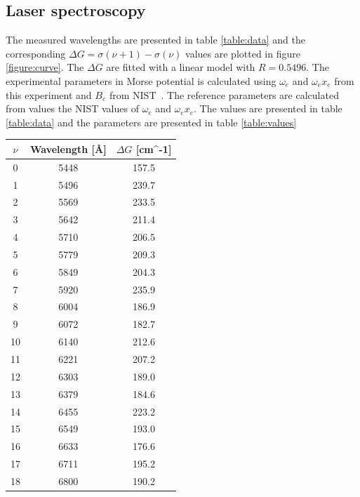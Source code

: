\documentclass[12pt]{article}
\begin{document}
\subsection{Laser spectroscopy}
The measured wavelengths are presented in table \ref{table:data} and the corresponding $\Delta G = \sigma(\nu + 1) - \sigma(\nu)$ values are plotted in figure \ref{figure:curve}. The $\Delta G$ are fitted with a linear model with $R = 0.5496$. The experimental parameters in Morse potential is calculated using $\omega_e$ and $\omega_ex_e$ from this experiment and $B_e$ from NIST~\cite{NIST}. The reference parameters are calculated from values the NIST values of $\omega_e$ and $\omega_ex_e$. The values are presented in table \ref{table:data} and the parameters are presented in table \ref{table:values}

\begin{table}[ht]
\centering
\begin{tabular}{| c | c | c | }
    \hline
    $\nu$ & Wavelength [Å] & $\Delta G$ [cm^-1] \\ \hline
    0   &   5448    &   157.5 \\ \hline
    1   &   5496    &   239.7 \\ \hline
    2   &   5569    &	233.5 \\ \hline
    3   &   5642    &   211.4 \\ \hline
    {\color{red} 4}   &   {\color{red}5710}	&	{\color{red}206.5} \\ \hline
    5   &   5779    &   209.3 \\ \hline
    6   &   5849	&	204.3 \\ \hline
    7   &   5920    &   235.9 \\ \hline
    8   &   6004	&	186.9 \\ \hline
    {\color{red} 9}   &   {\color{red}6072}	&	{\color{red}182.7} \\ \hline
    10  &   6140	&	212.6 \\ \hline
    {\color{red} 11}   &   {\color{red}6221}	&	{\color{red}207.2} \\ \hline
    12  &   6303	&	189.0 \\ \hline
    13  &   6379	&	184.6 \\ \hline
    14  &   6455	&	223.2 \\ \hline
    15  &   6549	&	193.0 \\ \hline
    16  &   6633	&	176.6 \\ \hline
    17  &   6711	&	195.2 \\ \hline
    {\color{red} 18}   &   {\color{red}6800}	&	{\color{red}190.2} \\ \hline

\end{tabular}
\end{table}
\end{document}
